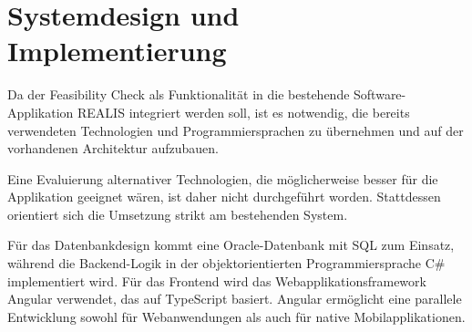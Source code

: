 \chapter{Systemdesign und Implementierung}\label{Chap:systemdesign-implementation}

Da der Feasibility Check als Funktionalität in die bestehende Software-Applikation \gls{REALIS} integriert werden soll, ist es notwendig, die bereits verwendeten Technologien und Programmiersprachen zu übernehmen und auf der vorhandenen Architektur aufzubauen.

Eine Evaluierung alternativer Technologien, die möglicherweise besser für die Applikation geeignet wären, ist daher nicht durchgeführt worden. Stattdessen orientiert sich die Umsetzung strikt am bestehenden System.

Für das Datenbankdesign kommt eine Oracle-Datenbank mit SQL zum Einsatz, während die Backend-Logik in der objektorientierten Programmiersprache C\# implementiert wird. Für das Frontend wird das Webapplikationsframework Angular verwendet, das auf TypeScript basiert. Angular ermöglicht eine parallele Entwicklung sowohl für Web\-anwendungen als auch für native Mobilapplikationen.












